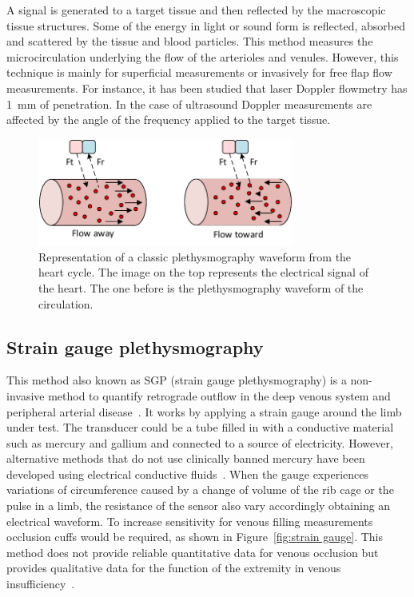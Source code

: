 A signal is generated to a target tissue and then reflected by the macroscopic tissue structures. Some of the energy in light or sound form is reflected, absorbed and scattered by the tissue and blood particles. This method measures the microcirculation underlying the flow of the arterioles and venules. However, this technique is mainly for superficial measurements or invasively for free flap flow measurements. For instance, it has been studied that laser Doppler flowmetry has \SI{1}{\milli\meter} of penetration. In the case of ultrasound Doppler measurements are affected by the angle of the frequency applied to the target tissue.


\begin{figure}[!htpb]
	\centering
	\includegraphics[width=0.75\textwidth,keepaspectratio]{figure5}    
	\caption[Doppler technique to measure flow]{Representation of a classic plethysmography waveform from the heart cycle. The image on the top represents the electrical signal of the heart. The one before is the plethysmography waveform of the circulation.}
	\label{fig:Doppler method}
\end{figure}


\subsection{Strain gauge plethysmography}
\label{section literature 3.3}
This method also known as SGP (strain gauge plethysmography) is a non-invasive method to quantify retrograde outflow in the deep venous system and peripheral arterial disease~\cite{holohan1996plethysmography}. It works by applying a strain gauge around the limb under test. The transducer could be a tube filled in with a conductive material such as mercury and gallium and connected to a source of electricity. However, alternative methods that do not use clinically banned mercury have been developed using electrical conductive fluids~\cite{flowers1981strain}. When the gauge experiences variations of circumference caused by a change of volume of the rib cage or the pulse in a limb, the resistance of the sensor also vary accordingly obtaining an electrical waveform. To increase sensitivity for venous filling measurements occlusion cuffs would be required, as shown in Figure~\ref{fig:strain gauge}. This method does not provide reliable quantitative data for venous occlusion but provides qualitative data for the function of the extremity in venous insufficiency~\cite{holohan1996plethysmography}. 

